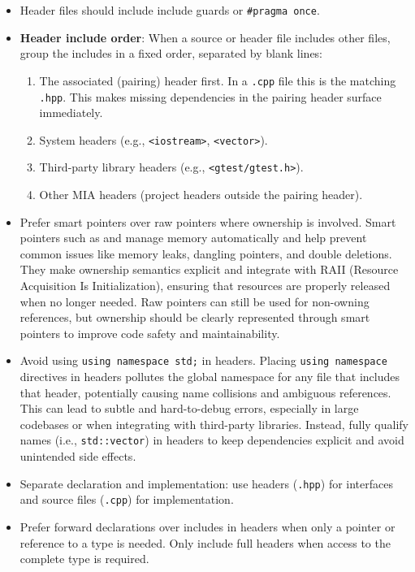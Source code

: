 \begin{itemize}\itemsep0em
    \item Header files should include include guards or \texttt{\#pragma once}.
    \item \textbf{Header include order}: When a source or header file includes other files, group the includes in a fixed order, separated by blank lines:
        \begin{enumerate}\itemsep0em
        \item The associated (pairing) header first. In a \texttt{.cpp} file this is the matching \texttt{.hpp}. This makes missing dependencies in the pairing header surface immediately.
        \item System headers (e.g., \texttt{<iostream>}, \texttt{<vector>}).
        \item Third-party library headers (e.g., \texttt{<gtest/gtest.h>}).
        \item Other MIA headers (project headers outside the pairing header).
        \end{enumerate}
    \item Prefer smart pointers over raw pointers where ownership is involved. Smart pointers such as  and  manage memory automatically and help prevent common issues like memory leaks, dangling pointers, and double deletions. They make ownership semantics explicit and integrate with RAII (Resource Acquisition Is Initialization), ensuring that resources are properly released when no longer needed. Raw pointers can still be used for non-owning references, but ownership should be clearly represented through smart pointers to improve code safety and maintainability.    
    \item Avoid using \texttt{using namespace std;} in headers. Placing \texttt{using namespace} directives in headers pollutes the global namespace for any file that includes that header, potentially causing name collisions and ambiguous references. This can lead to subtle and hard-to-debug errors, especially in large codebases or when integrating with third-party libraries. Instead, fully qualify names (i.e., \texttt{std::vector}) in headers to keep dependencies explicit and avoid unintended side effects.
    \item Separate declaration and implementation: use headers (\texttt{.hpp}) for interfaces and source files (\texttt{.cpp}) for implementation.
    \item Prefer forward declarations over includes in headers when only a pointer or reference to a type is needed. Only include full headers when access to the complete type is required.

\end{itemize}
